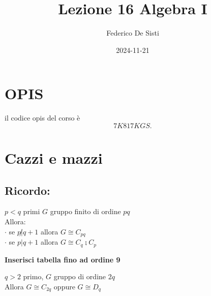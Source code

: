 \documentclass[12px]{article}
\title{Lezione 16 Algebra I}
\date{2024-11-21}
\author{Federico De Sisti}
\begin{document}
	\maketitle
	\newpage
	\section{OPIS}
	il codice opis del corso è 
	\[
	7K817KGS
	.\] 
	\section{Cazzi e mazzi}
	\subsection{Ricordo:}
	\begin{teo}
		$p < q$ primi $G$ gruppo finito di ordine $pq$\\
		Allora:\\
		$\cdot$ se $p\not | q + 1$ allora $G\cong C_{pq}$\\
		 $\cdot$ se $p | q + 1$ allora $ G\cong C_q\semi C_p$
	\end{teo}
	\textbf{Inserisci tabella fino ad ordine 9}
	\begin{coro}
		$q > 2$ primo, $G$ gruppo di ordine $2q$\\
		Allora $G\cong C_{2q}$ oppure $G\cong D_q$
	\end{coro}
\end{document}
